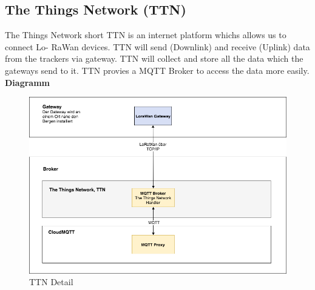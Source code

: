 \documentclass[11pt,english,german]{report}
\theoremstyle{definition}
\begin{document}
\subsection{The Things Network (TTN)}
The Things Network short TTN is an internet platform whichs allows us to connect Lo-
RaWan devices. TTN will send (Downlink) and receive (Uplink) data from the trackers
via gateway. TTN will collect and store all the data which the gateways send to it. TTN
provies a MQTT Broker to access the data more easily.\\[0.3cm]
\textbf{Diagramm}
\begin{figure}[H]
	\centering
	\includegraphics[width=\textwidth]{img/system/ATAS_SystemOverview_TTN_BA.png}
	\caption[TTN Detail]
	{TTN Detail}
\end{figure}

\newpage
\end{document}
